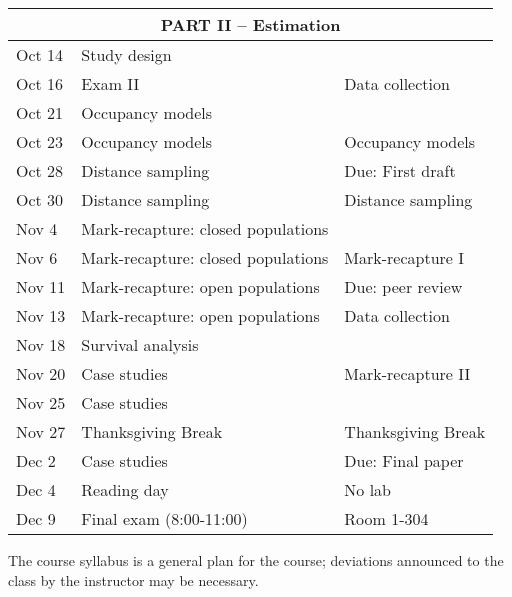 \documentclass[12pt]{article}
\begin{document}
\begin{center}
\begin{tabular}[c]{lll}
\hline
           \multicolumn{3}{c}{PART II -- Estimation}                                   \\
\hline
Oct 14     & Study design                       &                                      \\
Oct 16     & Exam II                            & Data collection                      \\
\hline
Oct 21     & Occupancy models                   &                                      \\
Oct 23     & Occupancy models                   & Occupancy models                     \\
\hline
Oct 28     & Distance sampling                  & Due: First draft                     \\
Oct 30     & Distance sampling                  & Distance sampling                    \\
\hline
Nov 4      & Mark-recapture: closed populations &                                      \\
Nov 6      & Mark-recapture: closed populations & Mark-recapture I                     \\
\hline
Nov 11     & Mark-recapture: open populations   & Due: peer review                     \\
Nov 13     & Mark-recapture: open populations   & Data collection                      \\
\hline
Nov 18     & Survival analysis                  &                                      \\
Nov 20     & Case studies                       & Mark-recapture II                   \\
\hline
Nov 25     & Case studies                       &                                      \\
Nov 27     & Thanksgiving Break                 & Thanksgiving Break                    \\
\hline
Dec 2      & Case studies                       & Due: Final paper                     \\
Dec 4      & Reading day                        & No lab                               \\
\hline
Dec 9     & Final exam (8:00-11:00)            &  Room 1-304                                 \\
\hline \hline
\end{tabular}
\end{center}

The course syllabus is a general plan for the course; deviations announced to the class by the instructor may be necessary.
\end{document}
